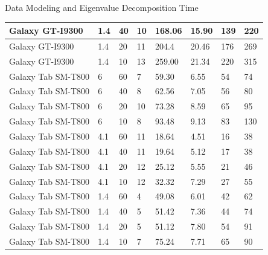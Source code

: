 \documentclass[newPxFont, numfooter, sectionpages]{beamer}
\begin{document}
\begin{frame}[c]{Data Modeling and Eigenvalue Decomposition Time}
\begin{table}
\begin{tabular}{|l|l|l|l|l|l|l|l|}
			Galaxy GT-I9300	& 1.4	& 40	& 10	& 168.06	& 15.90	& 139	& 220	\\ \hline
			Galaxy GT-I9300	& 1.4	& 20	& 11	& 204.4	& 20.46	& 176	& 269	\\ \hline
			Galaxy GT-I9300	& 1.4	& 10	& 13	& 259.00	& 21.34	& 220	& 315	\\ \hline
			Galaxy Tab SM-T800	& 6	& 60	& 7	& 59.30	& 6.55	& 54	& 74	\\ \hline
			Galaxy Tab SM-T800	& 6	& 40	& 8	& 62.56	& 7.05	& 56	& 80	\\ \hline
			Galaxy Tab SM-T800	& 6	& 20	& 10	& 73.28	& 8.59	& 65	& 95	\\ \hline
			Galaxy Tab SM-T800	& 6	& 10	& 8	& 93.48	& 9.13	& 83	& 130	\\ \hline
			Galaxy Tab SM-T800	& 4.1	& 60	& 11	& 18.64	& 4.51	& 16	& 38	\\ \hline
			Galaxy Tab SM-T800	& 4.1	& 40	& 11	& 19.64	& 5.12	& 17	& 38	\\ \hline
			Galaxy Tab SM-T800	& 4.1	& 20	& 12	& 25.12	& 5.55	& 21	& 46	\\ \hline
			Galaxy Tab SM-T800	& 4.1	& 10	& 12	& 32.32	& 7.29	& 27	& 55	\\ \hline
			Galaxy Tab SM-T800	& 1.4	& 60	& 4	& 49.08	& 6.01	& 42	& 62	\\ \hline
			Galaxy Tab SM-T800	& 1.4	& 40	& 5	& 51.42	& 7.36	& 44	& 74	\\ \hline
			Galaxy Tab SM-T800	& 1.4	& 20	& 5	& 51.12	& 7.80	& 54	& 91	\\ \hline
			Galaxy Tab SM-T800	& 1.4	& 10	& 7	& 75.24	& 7.71	& 65	& 90	\\ \hline
		\end{tabular}
	\end{table}
	
\end{frame}
\end{document}
